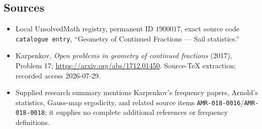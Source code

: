 \documentclass[11pt]{article}
\begin{document}
\subsection{Sources}
\begin{itemize}
\item Local UnsolvedMath registry, permanent ID \(1900017\), exact source code \texttt{catalogue entry}, ``Geometry of Continued Fractions --- Sail statistics.''
\item Karpenkov, \emph{Open problems in geometry of continued fractions} (2017), Problem 17; \url{https://arxiv.org/abs/1712.01450}. Source-TeX extraction; recorded access 2026-07-29.
\item Supplied research summary mentions Karpenkov's frequency papers, Arnold's statistics, Gauss-map ergodicity, and related source items \texttt{AMR-018-0016}/\texttt{AMR-018-0018}; it supplies no complete additional references or frequency definitions.
\end{itemize}
\end{document}
